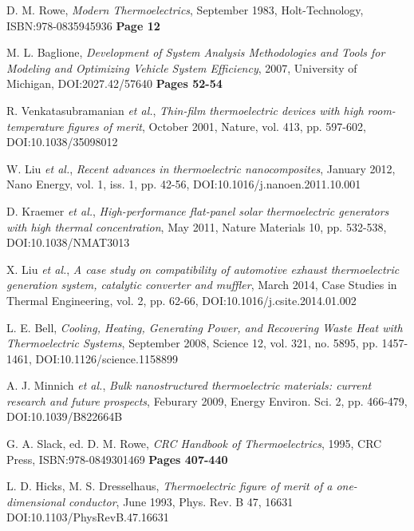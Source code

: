 \documentclass[12pt,draft]{article}
\begin{document}
\begin{thebibliography}{11}

D. M. Rowe,
\emph{Modern Thermoelectrics},
September 1983,
Holt-Technology,
ISBN:978-0835945936
\textbf{Page 12}

M. L. Baglione,
\emph{Development of System Analysis Methodologies and Tools for Modeling and Optimizing Vehicle System Efficiency},
2007,
University of Michigan,
DOI:2027.42/57640
\textbf{Pages 52-54}

R. Venkatasubramanian \emph{et al.},
\emph{Thin-film thermoelectric devices with high room-temperature figures of merit},
October 2001,
Nature, vol. 413, pp. 597-602,
DOI:10.1038/35098012

W. Liu \emph{et al.},
\emph{Recent advances in thermoelectric nanocomposites},
January 2012,
Nano Energy, vol. 1, iss. 1, pp. 42-56,
DOI:10.1016/j.nanoen.2011.10.001

D. Kraemer \emph{et al.},
\emph{High-performance flat-panel solar thermoelectric
generators with high thermal concentration},
May 2011,
Nature Materials 10, pp. 532-538,
DOI:10.1038/NMAT3013

X. Liu \emph{et al.},
\emph{A case study on compatibility of automotive exhaust thermoelectric generation system, catalytic converter and muffler},
March 2014,
Case Studies in Thermal Engineering, vol. 2, pp. 62-66,
DOI:10.1016/j.csite.2014.01.002

L. E. Bell,
\emph{Cooling, Heating, Generating Power, and Recovering Waste Heat with Thermoelectric Systems},
September 2008,
Science 12, vol. 321, no. 5895, pp. 1457-1461,
DOI:10.1126/science.1158899

A. J. Minnich \emph{et al.},
\emph{Bulk nanostructured thermoelectric materials: current research and future prospects},
Feburary 2009,
Energy Environ. Sci. 2, pp. 466-479,
DOI:10.1039/B822664B

G. A. Slack, ed. D. M. Rowe,
\emph{CRC Handbook of Thermoelectrics},
1995,
CRC Press,
ISBN:978-0849301469
\textbf{Pages 407-440}

L. D. Hicks, M. S. Dresselhaus,
\emph{Thermoelectric figure of merit of a one-dimensional conductor},
June 1993,
Phys. Rev. B 47, 16631
DOI:10.1103/PhysRevB.47.16631


\end{thebibliography}
\end{document}
